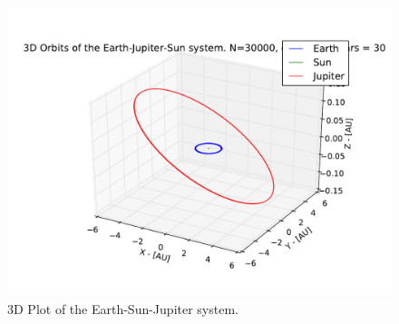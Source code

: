 \documentclass[12pt]{article}
\begin{document}
\begin{figure}[hbtp]
\centering
\includegraphics[width=\linewidth]{Plots/Earth_Sun_Jupiter_3D.pdf}
\caption{3D Plot of the Earth-Sun-Jupiter system.}
\end{figure}
\end{document}
